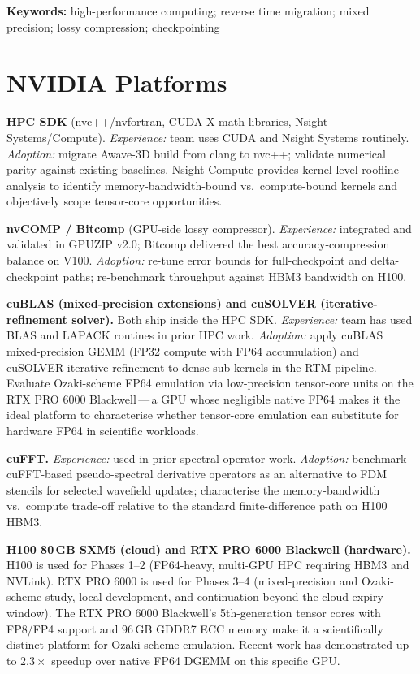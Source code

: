 \documentclass[11pt,a4paper]{article}
\newcommand{\gpuzip}{GPUZIP}
\begin{document}
\textbf{Keywords:} high-performance computing; reverse time migration; mixed
precision; lossy compression; checkpointing

\section*{NVIDIA Platforms}

\textbf{HPC SDK} (nvc++/nvfortran, CUDA-X math libraries, Nsight
Systems/Compute). \emph{Experience:} team uses CUDA and Nsight Systems
routinely. \emph{Adoption:} migrate Awave-3D build from clang to nvc++; validate
numerical parity against existing baselines. Nsight Compute provides
kernel-level roofline analysis to identify memory-bandwidth-bound vs.\
compute-bound kernels and objectively scope tensor-core opportunities.

\textbf{nvCOMP / Bitcomp} (GPU-side lossy compressor). \emph{Experience:}
integrated and validated in \gpuzip{} v2.0; Bitcomp delivered the best
accuracy-compression balance on V100. \emph{Adoption:} re-tune error bounds for
full-checkpoint and delta-checkpoint paths; re-benchmark throughput against HBM3
bandwidth on H100.

\textbf{cuBLAS (mixed-precision extensions) and cuSOLVER (iterative-refinement
solver).} Both ship inside the HPC SDK. \emph{Experience:} team has used BLAS
and LAPACK routines in prior HPC work. \emph{Adoption:} apply cuBLAS
mixed-precision GEMM (FP32 compute with FP64 accumulation) and cuSOLVER
iterative refinement to dense sub-kernels in the RTM pipeline. Evaluate
Ozaki-scheme FP64 emulation via low-precision tensor-core units on the RTX PRO
6000 Blackwell\,---\,a GPU whose negligible native FP64 makes it the ideal
platform to characterise whether tensor-core emulation can substitute for
hardware FP64 in scientific workloads.

\textbf{cuFFT.} \emph{Experience:} used in prior spectral operator work.
\emph{Adoption:} benchmark cuFFT-based pseudo-spectral derivative operators as
an alternative to FDM stencils for selected wavefield updates; characterise the
memory-bandwidth vs.\ compute trade-off relative to the standard
finite-difference path on H100 HBM3.

\textbf{H100 80\,GB SXM5 (cloud) and RTX PRO 6000 Blackwell (hardware).} H100 is
used for Phases 1--2 (FP64-heavy, multi-GPU HPC requiring HBM3 and NVLink). RTX
PRO 6000 is used for Phases 3--4 (mixed-precision and Ozaki-scheme study, local
development, and continuation beyond the cloud expiry window). The RTX PRO 6000
Blackwell's 5th-generation tensor cores with FP8/FP4 support and 96\,GB GDDR7
ECC memory make it a scientifically distinct platform for Ozaki-scheme
emulation. Recent work has demonstrated up to $2.3\times$ speedup over native
FP64 DGEMM on this specific GPU.
\end{document}
